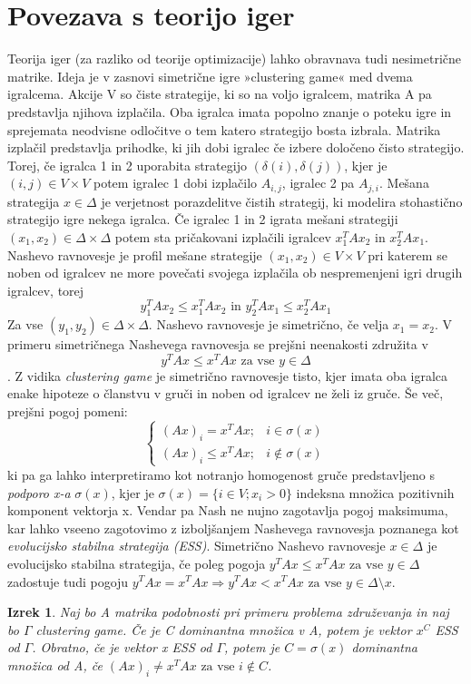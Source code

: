 \documentclass[a4paper]{article}
\newtheorem{theorem}{Izrek}
\begin{document}
\section{Povezava s teorijo iger}
Teorija iger (za razliko od teorije optimizacije) lahko obravnava tudi nesimetrične matrike. Ideja je v zasnovi simetrične igre »clustering game« med dvema igralcema. Akcije V so čiste strategije, ki so na voljo igralcem, matrika A pa predstavlja njihova izplačila. Oba igralca imata popolno znanje o poteku igre in sprejemata neodvisne odločitve o tem katero strategijo bosta izbrala. Matrika izplačil predstavlja prihodke, ki jih dobi igralec če izbere določeno čisto strategijo. Torej, če igralca 1 in 2 uporabita strategijo $(\delta(i),\delta(j))$, kjer je $(i,j)\in V\times V$ potem igralec 1 dobi izplačilo $A_{i,j}$, igralec 2 pa $A_{j,i}$.
Mešana strategija $x\in\Delta$ je verjetnost porazdelitve čistih strategij, ki modelira stohastično strategijo igre nekega igralca. Če igralec 1 in 2 igrata mešani strategiji $(x_1,x_2)\in\Delta\times\Delta$  potem sta pričakovani izplačili igralcev $x_1^TAx_2$ in $x_2^TAx_1$.
Nashevo ravnovesje je profil mešane strategije $(x_1,x_2)\in V\times V$ pri katerem se noben od igralcev ne more povečati svojega izplačila ob nespremenjeni igri drugih igralcev, torej 
$$y_1^TAx_2\leq x_1^TAx_2 \text{ in } y_2^TAx_1\leq x_2^TAx_1$$
Za vse $(y_1,y_2)\in\Delta\times\Delta$. Nashevo ravnovesje je simetrično, če velja $x_1=x_2$. V primeru simetričnega Nashevega ravnovesja se prejšni neenakosti združita v
$$y^TAx\leq x^TAx \text{ za vse } y\in\Delta$$.
Z vidika \textit{clustering game} je simetrično ravnovesje tisto, kjer imata oba igralca enake hipoteze o članstvu v gruči in noben od igralcev ne želi iz gruče. Še več, prejšni pogoj pomeni:
$$\begin{cases}
(Ax)_i=x^TAx; & i\in\sigma(x) \\ (Ax)_i\leq x^TAx; & i\not\in\sigma(x)
\end{cases}$$
ki pa ga lahko interpretiramo kot notranjo homogenost gruče predstavljeno s \textit{podporo x-a} $\sigma(x)$, kjer je $\sigma(x) = \{i\in V; x_i > 0\}$ indeksna množica pozitivnih komponent vektorja x.
Vendar pa Nash ne nujno zagotavlja pogoj maksimuma, kar lahko vseeno zagotovimo z izboljšanjem Nashevega ravnovesja poznanega kot \textit{evolucijsko stabilna strategija (ESS)}. Simetrično Nashevo ravnovesje $x\in\Delta$ je evolucijsko stabilna strategija, če poleg pogoja $y^TAx\leq x^TAx \text{ za vse } y\in\Delta$ zadostuje tudi pogoju $y^TAx= x^TAx \Rightarrow y^TAx<x^TAx \text{ za vse } y\in\Delta\setminus x$.
\begin{theorem}
Naj bo A matrika podobnosti pri primeru problema združevanja in naj bo $\Gamma$ \textit{clustering game}. Če je C dominantna množica v A, potem je vektor $x^C$ ESS od $\Gamma$. Obratno, če je vektor x ESS od $\Gamma$, potem je $C=\sigma(x)$ dominantna množica od A, če $(Ax)_i\not=x^TAx \text{ za vse } i \not\in C$.
\end{theorem}
\end{document}
